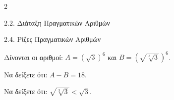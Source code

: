 \begin{ylh}{2}
    \item 2.2. Διάταξη Πραγματικών Αριθμών
    \item 2.4. Ρίζες Πραγματικών Αριθμών
\end{ylh}
Δίνονται οι αριθμοί: $A = (\sqrt{3})^6$ και $B = (\sqrt{\sqrt[3]{3}})^6$.
\begin{alist}
\item Να δείξετε ότι: $A - B = 18$. 
\item Να δείξετε ότι: $\sqrt{\sqrt[3]{3}} < \sqrt{3}$. 
\end{alist}

